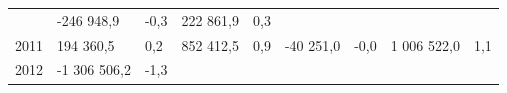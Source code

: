 \begin{longtable}[]{@{}lllllllll@{}}
\begin{minipage}[t]{0.06\columnwidth}
\end{minipage} & \begin{minipage}[t]{0.12\columnwidth}\raggedright
-246 948,9\strut
\end{minipage} & \begin{minipage}[t]{0.06\columnwidth}\raggedright
-0,3\strut
\end{minipage} & \begin{minipage}[t]{0.10\columnwidth}\raggedright
222 861,9\strut
\end{minipage} & \begin{minipage}[t]{0.06\columnwidth}\raggedright
0,3\strut
\end{minipage}\tabularnewline
\begin{minipage}[t]{0.05\columnwidth}\raggedright
2011\strut
\end{minipage} & \begin{minipage}[t]{0.10\columnwidth}\raggedright
194 360,5\strut
\end{minipage} & \begin{minipage}[t]{0.06\columnwidth}\raggedright
0,2\strut
\end{minipage} & \begin{minipage}[t]{0.16\columnwidth}\raggedright
852 412,5\strut
\end{minipage} & \begin{minipage}[t]{0.06\columnwidth}\raggedright
0,9\strut
\end{minipage} & \begin{minipage}[t]{0.12\columnwidth}\raggedright
-40 251,0\strut
\end{minipage} & \begin{minipage}[t]{0.06\columnwidth}\raggedright
-0,0\strut
\end{minipage} & \begin{minipage}[t]{0.10\columnwidth}\raggedright
1 006 522,0\strut
\end{minipage} & \begin{minipage}[t]{0.06\columnwidth}\raggedright
1,1\strut
\end{minipage}\tabularnewline
\begin{minipage}[t]{0.05\columnwidth}\raggedright
2012\strut
\end{minipage} & \begin{minipage}[t]{0.10\columnwidth}\raggedright
-1 306 506,2\strut
\end{minipage} & \begin{minipage}[t]{0.06\columnwidth}\raggedright
-1,3\strut
\end{minipage} & \begin{minipage}[t]{0.16\columnwidth}\raggedright

\end{minipage}
\end{longtable}
